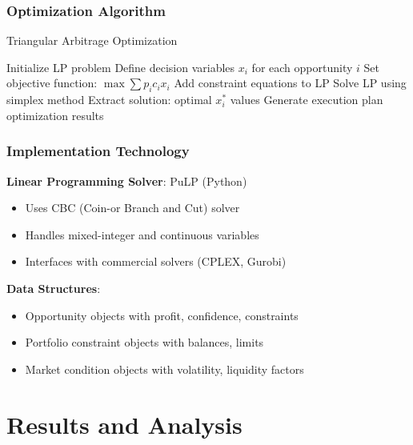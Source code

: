 \documentclass{beamer}
\begin{document}
\begin{frame}
\frametitle{Optimization Algorithm}
\begin{algorithm}[H]
\caption{Triangular Arbitrage Optimization}
\begin{algorithmic}[1]
    \State Initialize LP problem
    \State Define decision variables $x_i$ for each opportunity $i$
    \State Set objective function: $\max \sum p_i c_i x_i$
        \State Add constraint equations to LP
    \EndFor
    \State Solve LP using simplex method
    \State Extract solution: optimal $x_i^*$ values
    \State Generate execution plan
    \State \Return optimization results
\EndProcedure
\end{algorithmic}
\end{algorithm}
\end{frame}

\begin{frame}
\frametitle{Implementation Technology}
\textbf{Linear Programming Solver}: PuLP (Python)
\begin{itemize}
    \item Uses CBC (Coin-or Branch and Cut) solver
    \item Handles mixed-integer and continuous variables
    \item Interfaces with commercial solvers (CPLEX, Gurobi)
\end{itemize}

\vspace{0.5cm}

\textbf{Data Structures}:
\begin{itemize}
    \item Opportunity objects with profit, confidence, constraints
    \item Portfolio constraint objects with balances, limits
    \item Market condition objects with volatility, liquidity factors
\end{itemize}
\end{frame}

\section{Results and Analysis}
\end{document}
